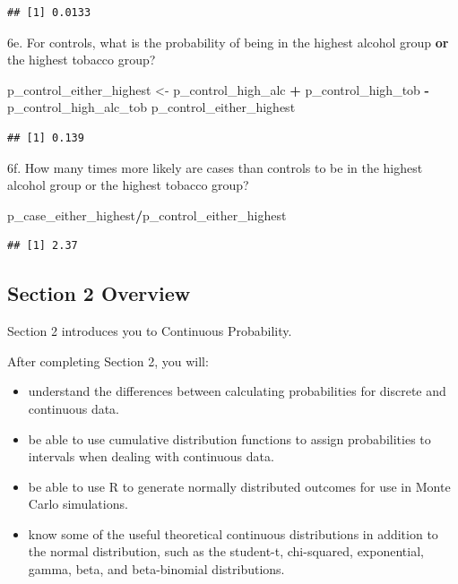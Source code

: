 \documentclass[
]{article}
\newenvironment{Shaded}{\begin{snugshade}}{\end{snugshade}}
\newcommand{\NormalTok}[1]{#1}
\newcommand{\OperatorTok}[1]{\textcolor[rgb]{0.81,0.36,0.00}{\textbf{#1}}}
\newcommand{\StringTok}[1]{\textcolor[rgb]{0.31,0.60,0.02}{#1}}
\providecommand{\tightlist}{%
  \setlength{\itemsep}{0pt}\setlength{\parskip}{0pt}}
\begin{document}
\begin{verbatim}
## [1] 0.0133
\end{verbatim}

6e. For controls, what is the probability of being in the highest
alcohol group \textbf{or} the highest tobacco group?

\begin{Shaded}
\begin{Highlighting}[]
\NormalTok{p\_control\_either\_highest \textless{}{-}}\StringTok{ }\NormalTok{p\_control\_high\_alc }\OperatorTok{+}\StringTok{ }\NormalTok{p\_control\_high\_tob }\OperatorTok{{-}}\StringTok{ }\NormalTok{p\_control\_high\_alc\_tob}
\NormalTok{p\_control\_either\_highest}
\end{Highlighting}
\end{Shaded}

\begin{verbatim}
## [1] 0.139
\end{verbatim}

6f. How many times more likely are cases than controls to be in the
highest alcohol group or the highest tobacco group?

\begin{Shaded}
\begin{Highlighting}[]
\NormalTok{p\_case\_either\_highest}\OperatorTok{/}\NormalTok{p\_control\_either\_highest}
\end{Highlighting}
\end{Shaded}

\begin{verbatim}
## [1] 2.37
\end{verbatim}

\hypertarget{section-2-overview}{%
\subsection{Section 2 Overview}\label{section-2-overview}}

Section 2 introduces you to Continuous Probability.

After completing Section 2, you will:

\begin{itemize}
\tightlist
\item
  understand the differences between calculating probabilities for
  discrete and continuous data.
\item
  be able to use cumulative distribution functions to assign
  probabilities to intervals when dealing with continuous data.
\item
  be able to use R to generate normally distributed outcomes for use in
  Monte Carlo simulations.
\item
  know some of the useful theoretical continuous distributions in
  addition to the normal distribution, such as the student-t,
  chi-squared, exponential, gamma, beta, and beta-binomial
  distributions.
\end{itemize}
\end{document}
